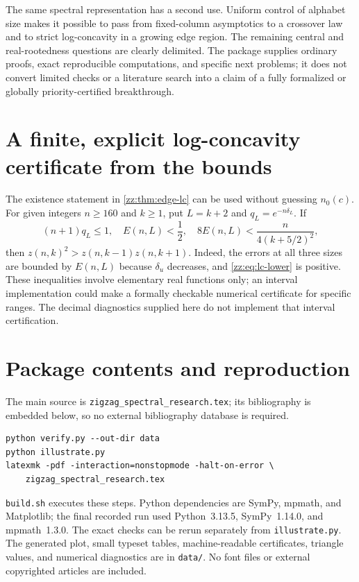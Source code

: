 \documentclass[11pt,a4paper]{article}
\theoremstyle{definition}
\begin{document}
The same spectral representation has a second use.  Uniform control of
alphabet size makes it possible to pass from fixed-column asymptotics to a
crossover law and to strict log-concavity in a growing edge region.
The remaining central and real-rootedness questions are clearly delimited.
The package supplies ordinary proofs, exact reproducible computations, and
specific next problems; it does not convert limited checks or a literature
search into a claim of a fully formalized or globally priority-certified
breakthrough.

\appendix
\section{A finite, explicit log-concavity certificate from the bounds}
\label{zz:app:finite-criterion}
The existence statement in \cref{zz:thm:edge-lc} can be used without guessing
$n_0(c)$.  For given integers $n\ge160$ and $k\ge1$, put $L=k+2$ and
$q_L=e^{-n\delta_L}$.  If
\begin{equation}\label{zz:eq:finite-criterion}
 (n+1)q_L\le1,\quad E(n,L)<\frac12,\quad
 8E(n,L)<\frac{n}{4(k+5/2)^2},
\end{equation}
then $z(n,k)^2>z(n,k-1)z(n,k+1)$.
Indeed, the errors at all three sizes are bounded by $E(n,L)$ because
$\delta_u$ decreases, and \eqref{zz:eq:lc-lower} is positive.
These inequalities involve elementary real functions only; an interval
implementation could make a formally checkable numerical certificate for
specific ranges.  The decimal diagnostics supplied here do not implement
that interval certification.

\section{Package contents and reproduction}
\label{zz:app:package}
The main source is \texttt{zigzag\_spectral\_research.tex}; its bibliography is
embedded below, so no external bibliography database is required.
\begin{verbatim}
python verify.py --out-dir data
python illustrate.py
latexmk -pdf -interaction=nonstopmode -halt-on-error \
    zigzag_spectral_research.tex
\end{verbatim}
\texttt{build.sh} executes these steps.  Python dependencies are SymPy,
mpmath, and Matplotlib; the final recorded run used Python~3.13.5,
SymPy~1.14.0, and mpmath~1.3.0.
The exact checks can be rerun separately from \texttt{illustrate.py}.
The generated plot, small typeset tables, machine-readable certificates,
triangle values, and numerical diagnostics are in \texttt{data/}.
No font files or external copyrighted articles are included.
\end{document}
